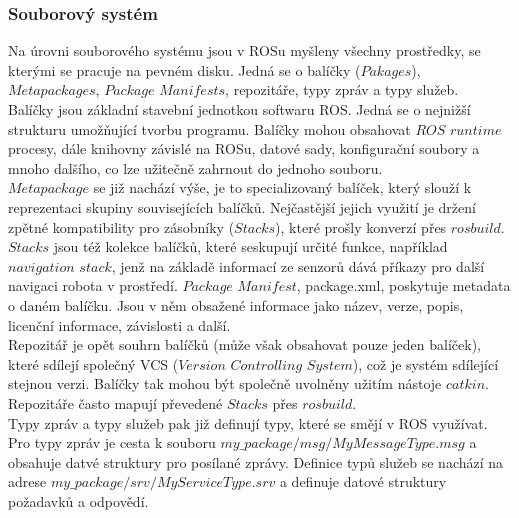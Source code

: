 \documentclass[12pt]{article}
\begin{document}
\subsubsection{Souborový systém}
Na úrovni souborového systému jsou v ROSu myšleny všechny prostředky, se kterými se pracuje na pevném disku. Jedná se o balíčky ($Pakages$), $Metapackages$, $Package$ $Manifests$, repozitáře, typy zpráv a typy služeb.\\
\indent Balíčky jsou základní stavební jednotkou softwaru ROS. Jedná se o nejnižší strukturu umožňující tvorbu programu. Balíčky mohou obsahovat $ROS$ $runtime$ procesy, dále knihovny závislé na ROSu, datové sady, konfigurační soubory a mnoho dalšího, co lze užitečně zahrnout do jednoho souboru.\\
\indent $Metapackage$ se již nachází výše, je to specializovaný balíček, který slouží k reprezentaci skupiny souvisejících balíčků. Nejčastější jejich využití je držení zpětné kompatibility pro zásobníky ($Stacks$), které prošly konverzí přes $rosbuild$. $Stacks$ jsou též kolekce balíčků, které seskupují určité funkce, například $navigation$ $stack$, jenž na základě informací ze senzorů dává příkazy pro další navigaci robota v prostředí. $Package$ $Manifest$, package.xml, poskytuje metadata o daném balíčku. Jsou v něm obsažené informace jako název, verze, popis, licenční informace, závislosti a další.\\
\indent Repozitář je opět souhrn balíčků (může však obsahovat pouze jeden balíček), které sdílejí společný VCS ($Version$ $Controlling$ $System$), což je systém sdílející stejnou verzi. Balíčky tak mohou být společně uvolněny užitím nástoje $catkin$. Repozitáře často mapují převedené $Stacks$ přes $rosbuild$.\\
\indent Typy zpráv a typy služeb pak již definují typy, které se smějí v ROS využívat. Pro typy zpráv je cesta k souboru $my\_package/msg/MyMessageType.msg$ a obsahuje datvé struktury pro posílané zprávy. Definice typů služeb se nachází na adrese $my\_package/srv/MyServiceType.srv$ a definuje datové struktury požadavků a odpovědí.\\
\end{document}

